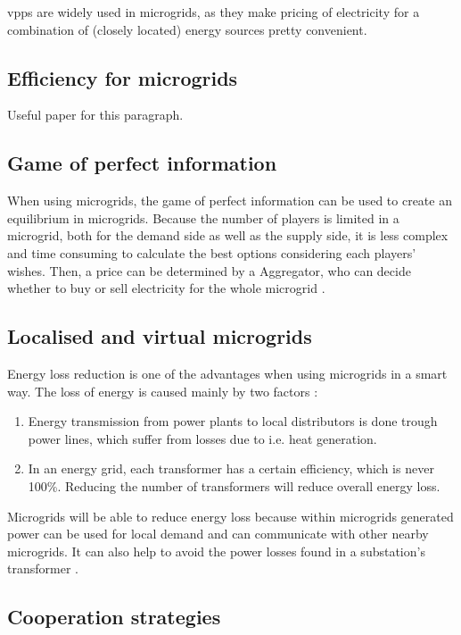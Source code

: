 \acp{vpp} are widely used in microgrids, as they make pricing of electricity for a combination of (closely located) energy sources pretty convenient.  

\subsection{Efficiency for microgrids}

Useful paper for this paragraph\cite{MicrogridModellingPetrosAristidou,HatziargyriouAsanoIravaniMarnay2007}.

\subsection{Game of perfect information}
When using microgrids, the game of perfect information can be used to create an equilibrium in microgrids. Because the number of players is limited in a microgrid, both for the demand side as well as the supply side, it is less complex and time consuming to calculate the best options considering each players' wishes. Then, a price can be determined by a Aggregator, who can decide whether to buy or sell electricity for the whole microgrid  \cite{MicrogridModellingPetrosAristidou}.

\subsection{Localised and virtual microgrids}
Energy loss reduction is one of the advantages when using microgrids in a smart way. The loss of energy is caused mainly by two factors \cite{EnergyLossURL}: 

\begin{enumerate}
\item Energy transmission from power plants to local distributors is done trough power lines, which suffer from losses due to i.e. heat generation\cite{LasseterPaigi2004}.
\item In an energy grid, each transformer has a certain efficiency, which is never 100\%. Reducing the number of transformers will reduce overall energy loss.
\end{enumerate}

Microgrids will be able to reduce energy loss because within microgrids generated power can be used for local demand and can communicate with other nearby microgrids. It can also help to avoid the power losses found in a substation's transformer \cite{keypaper}.


\subsection{Cooperation strategies}


